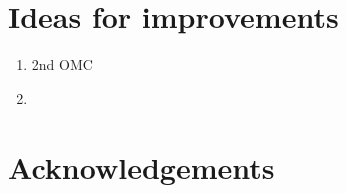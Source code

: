 \documentclass{ligodoc}
\begin{document}
\section{Ideas for improvements}

\begin{enumerate}
\item 2nd OMC
\item 

\end{enumerate}



\section{Acknowledgements}
\end{document}
